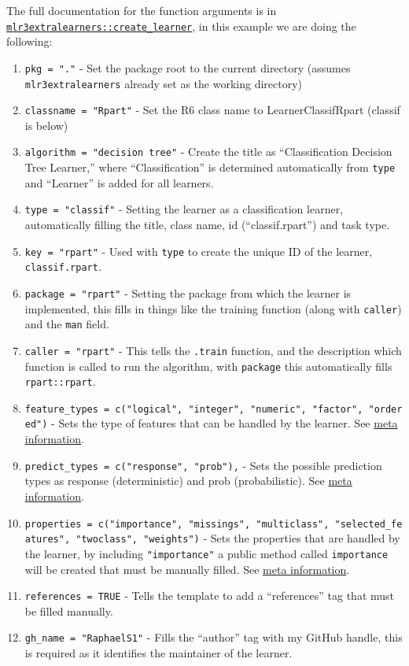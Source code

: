 \documentclass[
]{scrbook}
\providecommand{\tightlist}{%
  \setlength{\itemsep}{0pt}\setlength{\parskip}{0pt}}
\begin{document}
The full documentation for the function arguments is in \href{https://mlr3extralearners.mlr-org.com/reference/create_learner.html}{\texttt{mlr3extralearners::create\_learner}}, in this example we are doing the following:

\begin{enumerate}
\def\labelenumi{\arabic{enumi}.}
\tightlist
\item
  \texttt{pkg\ =\ "."} - Set the package root to the current directory (assumes \texttt{mlr3extralearners} already set as the working directory)
\item
  \texttt{classname\ =\ "Rpart"} - Set the R6 class name to LearnerClassifRpart (classif is below)
\item
  \texttt{algorithm\ =\ "decision\ tree"} - Create the title as ``Classification Decision Tree Learner,'' where ``Classification'' is determined automatically from \texttt{type} and ``Learner'' is added for all learners.
\item
  \texttt{type\ =\ "classif"} - Setting the learner as a classification learner, automatically filling the title, class name, id (``classif.rpart'') and task type.
\item
  \texttt{key\ =\ "rpart"} - Used with \texttt{type} to create the unique ID of the learner, \texttt{classif.rpart}.
\item
  \texttt{package\ =\ "rpart"} - Setting the package from which the learner is implemented, this fills in things like the training function (along with \texttt{caller}) and the \texttt{man} field.
\item
  \texttt{caller\ =\ "rpart"} - This tells the \texttt{.train} function, and the description which function is called to run the algorithm, with \texttt{package} this automatically fills \texttt{rpart::rpart}.
\item
  \texttt{feature\_types\ =\ c("logical",\ "integer",\ "numeric",\ "factor",\ "ordered")} - Sets the type of features that can be handled by the learner. See \protect\hyperlink{learner-meta-information}{meta information}.
\item
  \texttt{predict\_types\ =\ c("response",\ "prob"),} - Sets the possible prediction types as response (deterministic) and prob (probabilistic). See \protect\hyperlink{learner-meta-information}{meta information}.
\item
  \texttt{properties\ =\ c("importance",\ "missings",\ "multiclass",\ "selected\_features",\ "twoclass",\ "weights")} - Sets the properties that are handled by the learner, by including \texttt{"importance"} a public method called \texttt{importance} will be created that must be manually filled. See \protect\hyperlink{learner-meta-information}{meta information}.
\item
  \texttt{references\ =\ TRUE} - Tells the template to add a ``references'' tag that must be filled manually.
\item
  \texttt{gh\_name\ =\ "RaphaelS1"} - Fills the ``author'' tag with my GitHub handle, this is required as it identifies the maintainer of the learner.
\end{enumerate}
\end{document}
